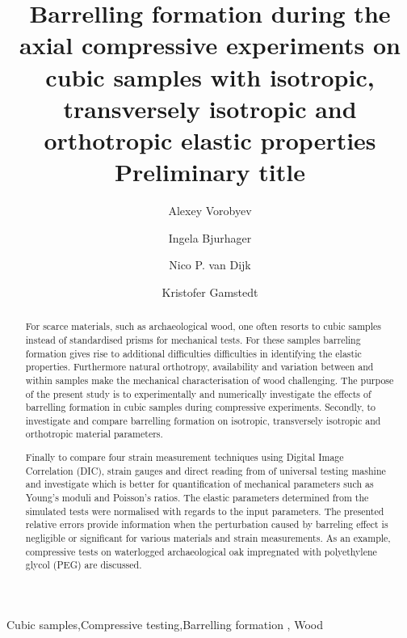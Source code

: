 \documentclass[review]{elsarticle}
\begin{document}
\doublespacing


\begin{frontmatter}

\title{Barrelling formation during the axial compressive experiments on cubic
samples with  isotropic, transversely isotropic and orthotropic elastic
properties {\color{red} Preliminary title}}







\author{Alexey Vorobyev}


\author{Ingela Bjurhager}
\author{Nico P. van Dijk}
\author{Kristofer Gamstedt}

\address{Uppsala University, Division of Appplied Mechanics,
Uppsala, Sweden }



\begin{abstract}
For scarce materials, such as archaeological wood, one often resorts to cubic
samples instead of standardised prisms for mechanical tests. For these samples
barreling formation gives rise to additional difficulties difficulties in
identifying the elastic properties.
Furthermore natural orthotropy, availability and variation between and within
samples make the mechanical characterisation of wood  challenging. 
The purpose of the present study is to experimentally and numerically investigate the effects of barrelling
formation in cubic samples during compressive experiments. Secondly, to investigate and
compare barrelling formation on isotropic, transversely 
isotropic and orthotropic material parameters. \par
Finally to compare four strain measurement techniques using
Digital Image Correlation (DIC), strain gauges and direct
reading from of universal testing mashine and investigate which is better for
quantification of mechanical parameters such as Young's moduli and Poisson's ratios.
The elastic parameters determined from the simulated tests were normalised with regards to the input parameters. The presented relative errors provide information when the perturbation caused by barreling effect is negligible or significant for various materials and strain measurements. 
As an example, compressive tests on waterlogged archaeological oak impregnated
with polyethylene glycol (PEG) are discussed.


\end{abstract}

\begin{keyword}
Cubic samples\sep Compressive testing\sep Barrelling formation \sep
Wood
\end{keyword}

\end{frontmatter}
\end{document}
